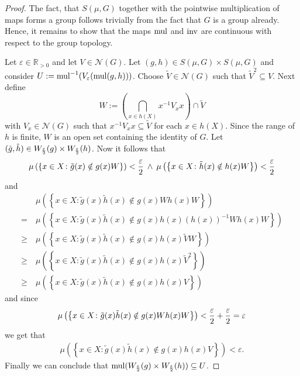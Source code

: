 \begin{proof}
  The fact, that $S(\mu, G)$ together with the pointwise multiplication of maps forms a group follows trivially from the fact that $G$ is a group already. Hence, it remains to show that the maps ${\rm mul}$ and ${\rm inv}$ are continuous with respect to the group topology.
 
  Let $\varepsilon \in \mathbb{R}_{>0}$ and let $V \in \mathcal{N}(G)$. Let $(g,h) \in S(\mu, G) \times S(\mu, G)$ and consider $U := {\rm mul}^{-1}(V_\varepsilon({\rm mul}(g,h)))$. Choose $\tilde{V} \in \mathcal{N}(G)$ such that $\tilde{V}^2 \subseteq V$. Next define \[W := \left(\bigcap\limits_{x\in h(X)} x^{-1}V_xx \right) \cap \tilde{V}\] with $V_x\in \mathcal{N}(G)$ such that $x^{-1}V_xx \subseteq \tilde{V}$ for each $x \in h(X)$. Since the range of $h$ is finite, $W$ is an open set containing the identity of $G$. Let $(\tilde{g}, \tilde{h})\in W_{\varepsilon\over 2}(g) \times W_{\varepsilon \over 2}(h)$. Now it follows that
  \begin{align*}
    \mu\left(\left\{x\in X\colon \tilde{g}(x) \notin g(x)W\right\}\right) < {\varepsilon\over 2} \: \land \: 
    \mu\left(\left\{x\in X\colon \tilde{h}(x) \notin h(x)W\right\}\right) < {\varepsilon \over 2}
  \end{align*}
  and 
  \begin{align*}
    &\mu\left(\left\{x \in X\colon \tilde{g}(x)\tilde{h}(x) \notin g(x)Wh(x)W \right\}\right) \\
    = \:&\mu\left(\left\{x \in X\colon \tilde{g}(x)\tilde{h}(x) \notin g(x)h(x)(h(x))^{-1}Wh(x)W \right\}\right) \\
    \geq \:&\mu\left(\left\{x \in X\colon \tilde{g}(x)\tilde{h}(x) \notin g(x)h(x)\tilde{V}W \right\}\right) \\
    \geq \:&\mu\left(\left\{x \in X\colon \tilde{g}(x)\tilde{h}(x) \notin g(x)h(x)\tilde{V}^2 \right\}\right) \\
    \geq \:&\mu\left(\left\{x \in X\colon \tilde{g}(x)\tilde{h}(x) \notin g(x)h(x)V \right\}\right) 
  \end{align*}
  and since
  \begin{align*}
    \mu\left(\left\{x \in X\colon \tilde{g}(x)\tilde{h}(x) \notin g(x)Wh(x)W \right\}\right) < {\varepsilon\over 2} + {\varepsilon\over 2} = \varepsilon
  \end{align*}
  we get that
  \begin{align*}
    \mu\left(\left\{x \in X\colon \tilde{g}(x)\tilde{h}(x) \notin g(x)h(x)V \right\}\right) < \varepsilon. 
  \end{align*}
  Finally we can conclude that ${\rm mul}(W_{\varepsilon \over 2}(g) \times W_{\varepsilon \over 2}(h)) \subseteq U$.


\end{proof}
